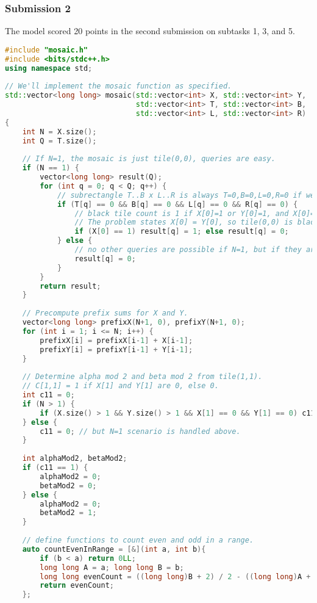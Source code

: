 \subsubsection{Submission 2}
The model scored 20 points in the second submission on subtasks 1, 3, and 5.
\begin{lstlisting}[language=C++]
#include "mosaic.h"
#include <bits/stdc++.h>
using namespace std;
 
// We'll implement the mosaic function as specified.
std::vector<long long> mosaic(std::vector<int> X, std::vector<int> Y,
                              std::vector<int> T, std::vector<int> B,
                              std::vector<int> L, std::vector<int> R)
{
    int N = X.size();
    int Q = T.size();
 
    // If N=1, the mosaic is just tile(0,0), queries are easy.
    if (N == 1) {
        vector<long long> result(Q);
        for (int q = 0; q < Q; q++) {
            // subrectangle T..B x L..R is always T=0,B=0,L=0,R=0 if we have queries.
            if (T[q] == 0 && B[q] == 0 && L[q] == 0 && R[q] == 0) {
                // black tile count is 1 if X[0]=1 or Y[0]=1, and X[0]=Y[0], else 0.
                // The problem states X[0] = Y[0], so tile(0,0) is black if X[0]=1.
                if (X[0] == 1) result[q] = 1; else result[q] = 0;
            } else {
                // no other queries are possible if N=1, but if they are, the subrectangle is empty or out of range.
                result[q] = 0;
            }
        }
        return result;
    }
 
    // Precompute prefix sums for X and Y.
    vector<long long> prefixX(N+1, 0), prefixY(N+1, 0);
    for (int i = 1; i <= N; i++) {
        prefixX[i] = prefixX[i-1] + X[i-1];
        prefixY[i] = prefixY[i-1] + Y[i-1];
    }
 
    // Determine alpha mod 2 and beta mod 2 from tile(1,1).
    // C[1,1] = 1 if X[1] and Y[1] are 0, else 0.
    int c11 = 0;
    if (N > 1) {
        if (X.size() > 1 && Y.size() > 1 && X[1] == 0 && Y[1] == 0) c11 = 1; else c11 = 0;
    } else {
        c11 = 0; // but N=1 scenario is handled above.
    }
 
    int alphaMod2, betaMod2;
    if (c11 == 1) {
        alphaMod2 = 0;
        betaMod2 = 0;
    } else {
        alphaMod2 = 0;
        betaMod2 = 1;
    }
 
    // define functions to count even and odd in a range.
    auto countEvenInRange = [&](int a, int b){
        if (b < a) return 0LL;
        long long A = a; long long B = b;
        long long evenCount = ((long long)B + 2) / 2 - ((long long)A + 1) / 2;
        return evenCount;
    };
 

\end{lstlisting}

